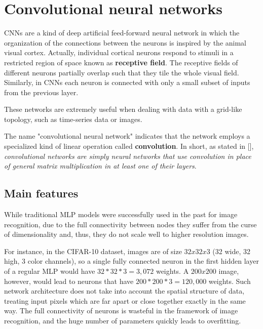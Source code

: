 \chapter{Convolutional neural networks}\label{ch:conv_nets}

\acp{CNN} are a kind of deep artificial feed-forward neural network in which the organization of the connections between the neurons is inspired by the animal visual cortex. Actually, individual cortical neurons respond to stimuli in a restricted region of space known as \textbf{receptive field}. The receptive fields of different neurons partially overlap such that they tile the whole visual field. Similarly, in \acp{CNN} each neuron is connected with only a small subset of inputs from the previous layer.

These networks are extremely useful when dealing with data with a grid-like topology, such as time-series data or images.

The name "convolutional neural network" indicates that the network employs a specialized kind of linear operation called \textbf{convolution}. In short, as stated in [\cite{Goodfellow-et-al-2016}], \emph{convolutional networks are simply neural networks that use convolution in place of general matrix multiplication in at least one of their layers}.

\section{Main features}

While traditional \acf{MLP} models were successfully used in the past for image recognition, due to the full connectivity between nodes they suffer from the curse of dimensionality and, thus, they do not scale well to higher resolution images.

For instance, in the CIFAR-10 dataset, images are of size $32x32x3$ (32 wide, 32 high, 3 color channels), so a single fully connected neuron in the first hidden layer of a regular \ac{MLP} would have $32*32*3 = 3,072$ weights. A $200x200$ image, however, would lead to neurons that have $200*200*3 = 120,000$ weights.
Such network architecture does not take into account the spatial structure of data, treating input pixels which are far apart or close together exactly in the same way. The full connectivity of neurons is wasteful in the framework of image recognition, and the huge number of parameters quickly leads to overfitting.

